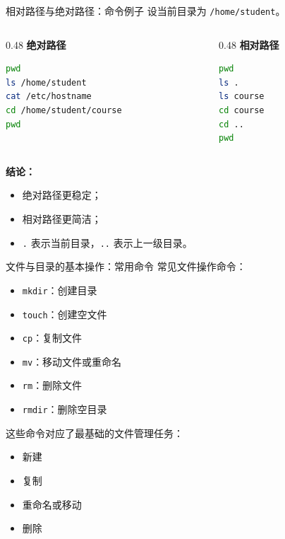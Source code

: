 \documentclass[aspectratio=169]{beamer}
\begin{document}
\begin{frame}[fragile]{相对路径与绝对路径：命令例子}
设当前目录为 \texttt{/home/student}。

\begin{columns}[T]
\begin{column}{0.48\textwidth}
\textbf{绝对路径}
\begin{lstlisting}[language=bash]
pwd
ls /home/student
cat /etc/hostname
cd /home/student/course
pwd
\end{lstlisting}
\end{column}

\begin{column}{0.48\textwidth}
\textbf{相对路径}
\begin{lstlisting}[language=bash]
pwd
ls .
ls course
cd course
cd ..
pwd
\end{lstlisting}
\end{column}
\end{columns}

\vspace{0.3em}
\textbf{结论：}
\begin{itemize}
  \item 绝对路径更稳定；
  \item 相对路径更简洁；
  \item \texttt{.} 表示当前目录，\texttt{..} 表示上一级目录。
\end{itemize}
\end{frame}

\begin{frame}{文件与目录的基本操作：常用命令}
常见文件操作命令：

\begin{itemize}
  \item \texttt{mkdir}：创建目录
  \item \texttt{touch}：创建空文件
  \item \texttt{cp}：复制文件
  \item \texttt{mv}：移动文件或重命名
  \item \texttt{rm}：删除文件
  \item \texttt{rmdir}：删除空目录
\end{itemize}

\vspace{0.8em}
这些命令对应了最基础的文件管理任务：
\begin{itemize}
  \item 新建
  \item 复制
  \item 重命名或移动
  \item 删除
\end{itemize}
\end{frame}
\end{document}
